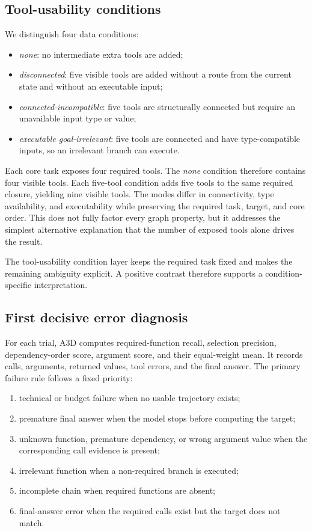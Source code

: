 \documentclass[pdflatex,sn-basic]{sn-jnl}
\begin{document}
\subsection{Tool-usability conditions}

We distinguish four data conditions:
\begin{itemize}
\item \emph{none}: no intermediate extra tools are added;
\item \emph{disconnected}: five visible tools are added without a route from
the current state and without an executable input;
\item \emph{connected-incompatible}: five tools are structurally connected but
require an unavailable input type or value;
\item \emph{executable goal-irrelevant}: five tools are connected and have
type-compatible inputs, so an irrelevant branch can execute.
\end{itemize}

Each core task exposes four required tools. The \emph{none} condition therefore
contains four visible tools. Each five-tool condition adds five tools to the same
required closure, yielding nine visible tools. The modes differ in connectivity,
type availability, and executability while preserving the required task, target,
and core order. This does not fully factor every graph property, but it
addresses the simplest alternative explanation that the number of exposed tools
alone drives the result.

The tool-usability condition layer keeps the required task fixed and makes the
remaining ambiguity explicit. A positive contrast therefore supports a
condition-specific interpretation.

\subsection{First decisive error diagnosis}

For each trial, A3D computes required-function recall, selection precision,
dependency-order score, argument score, and their equal-weight mean. It records
calls, arguments, returned values, tool errors, and the final answer. The
primary failure rule follows a fixed priority:
\begin{enumerate}
\item technical or budget failure when no usable trajectory exists;
\item premature final answer when the model stops before computing the target;
\item unknown function, premature dependency, or wrong argument value when the
corresponding call evidence is present;
\item irrelevant function when a non-required branch is executed;
\item incomplete chain when required functions are absent;
\item final-answer error when the required calls exist but the target does not
match.
\end{enumerate}
\end{document}
